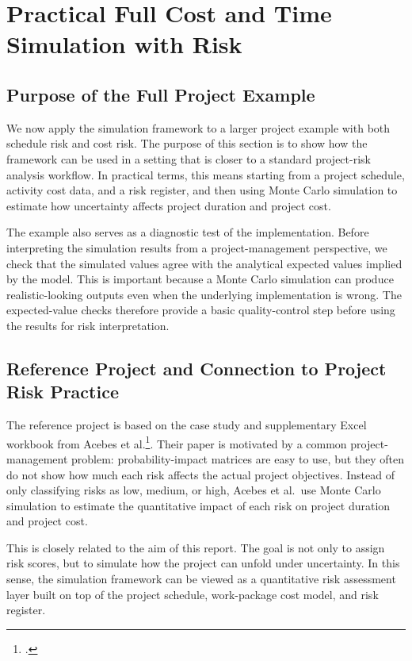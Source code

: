 \documentclass[11pt,a4paper]{article}
\newcommand{\1}{\mathbf{1}}
\theoremstyle{definition}
\theoremstyle{plain}
\theoremstyle{remark}
\numberwithin{equation}{section}
\begin{document}
\newpage

\section{Practical Full Cost and Time Simulation with Risk}

\subsection{Purpose of the Full Project Example}

We now apply the simulation framework to a larger project example with both schedule risk and cost risk. The purpose of this section is to show how the framework can be used in a setting that is closer to a standard project-risk analysis workflow. In practical terms, this means starting from a project schedule, activity cost data, and a risk register, and then using Monte Carlo simulation to estimate how uncertainty affects project duration and project cost.

The example also serves as a diagnostic test of the implementation. Before interpreting the simulation results from a project-management perspective, we check that the simulated values agree with the analytical expected values implied by the model. This is important because a Monte Carlo simulation can produce realistic-looking outputs even when the underlying implementation is wrong. The expected-value checks therefore provide a basic quality-control step before using the results for risk interpretation.

\subsection{Reference Project and Connection to Project Risk Practice}

The reference project is based on the case study and supplementary Excel workbook from Acebes et al.\footcite{acebes2024beyondProbabilityImpactMatrices}. Their paper is motivated by a common project-management problem: probability-impact matrices are easy to use, but they often do not show how much each risk affects the actual project objectives. Instead of only classifying risks as low, medium, or high, Acebes et al.\ use Monte Carlo simulation to estimate the quantitative impact of each risk on project duration and project cost.

This is closely related to the aim of this report. The goal is not only to assign risk scores, but to simulate how the project can unfold under uncertainty. In this sense, the simulation framework can be viewed as a quantitative risk assessment layer built on top of the project schedule, work-package cost model, and risk register.
\end{document}
